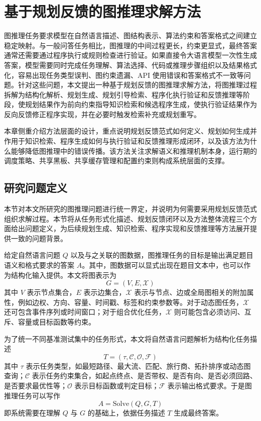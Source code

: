 \chapter{基于规划反馈的图推理求解方法}
\label{chp:method}

图推理任务要求模型在自然语言描述、图结构表示、算法约束和答案格式之间建立稳定映射。与一般问答任务相比，图推理的中间过程更长，约束更显式，最终答案通常还需要通过程序执行或规则检查进行验证。如果直接令大语言模型一次性生成答案，模型需要同时完成任务理解、算法选择、代码或推理步骤组织以及结果格式化，容易出现任务类型误判、图约束遗漏、API 使用错误和答案格式不一致等问题。针对这些问题，本文提出一种基于规划反馈的图推理求解方法，将图推理过程拆解为结构化解析、规划生成、规划引导检索、程序化执行验证和反馈推理等阶段，使规划结果作为前向约束指导知识检索和候选程序生成，使执行验证结果作为反向反馈修正程序实现，并在必要时触发检索补充或规划重写。

本章侧重介绍方法层面的设计，重点说明规划反馈范式如何定义、规划如何生成并作用于知识检索、程序生成如何与执行验证和反馈推理形成闭环，以及该方法为什么能够降低图推理中的错误传播。该方法关注求解语义和推理机制本身，运行期的调度策略、共享黑板、共享缓存管理和配置约束则构成系统层面的支撑。

\section{研究问题定义}

本节对本文所研究的图推理问题进行统一界定，并说明为何需要采用规划反馈范式组织求解过程。本节将从任务形式化描述、规划反馈闭环以及方法整体流程三个方面给出问题定义，为后续规划生成、知识检索、程序实现和反馈推理等方法展开提供一致的问题背景。

给定自然语言问题 $Q$ 以及与之关联的图数据，图推理任务的目标是输出满足题目语义和格式要求的答案 $A$。其中，图数据可以显式出现在题目文本中，也可以作为结构化输入提供。本文将图表示为
\begin{equation}
G=(V,E,\mathcal{X})
\end{equation}
其中 $V$ 表示节点集合，$E$ 表示边集合，$\mathcal{X}$ 表示与节点、边或全局图相关的附加属性，例如边权、方向、容量、时间戳、标签和约束参数等。对于动态图任务，$\mathcal{X}$ 还可包含事件序列或时间窗口；对于组合优化任务，$\mathcal{X}$ 则可能包含必须访问、互斥、容量或目标函数等约束。

为了统一不同基准测试集中的任务形式，本文将自然语言问题解析为结构化任务描述
\begin{equation}
T=(\tau,\mathcal{C},\mathcal{O},\mathcal{F})
\end{equation}
其中 $\tau$ 表示任务类型，如最短路径、最大流、匹配、旅行商、拓扑排序或动态图查询；$\mathcal{C}$ 表示任务约束集合，如起点终点、是否带权、是否有向、是否必须回路、是否要求最优性等；$\mathcal{O}$ 表示目标函数或判定目标；$\mathcal{F}$ 表示输出格式要求。于是图推理任务可以写作
\begin{equation}
A=\mathrm{Solve}(Q,G,T)
\end{equation}
即系统需要在理解 $Q$ 与 $G$ 的基础上，依据任务描述 $T$ 生成最终答案。

